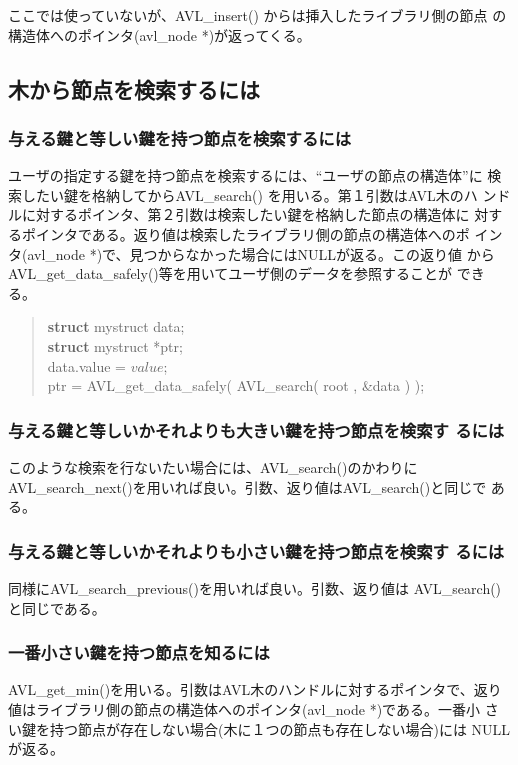 ここでは使っていないが、AVL\_insert() からは挿入したライブラリ側の節点
の構造体へのポインタ(avl\_node *)が返ってくる。

\subsection{木から節点を検索するには}
\subsubsection{与える鍵と等しい鍵を持つ節点を検索するには}
ユーザの指定する鍵を持つ節点を検索するには、``ユーザの節点の構造体''に
検索したい鍵を格納してからAVL\_search() を用いる。第１引数はAVL木のハ
ンドルに対するポインタ、第２引数は検索したい鍵を格納した節点の構造体に
対するポインタである。返り値は検索したライブラリ側の節点の構造体へのポ
インタ(avl\_node *)で、見つからなかった場合にはNULLが返る。この返り値
からAVL\_get\_data\_safely()等を用いてユーザ側のデータを参照することが
できる。
\begin{quote}
{\bf struct} mystruct data;\\
{\bf struct} mystruct *ptr;\\
data.value = $value$;\\
ptr = AVL\_get\_data\_safely( AVL\_search( root , \&data ) );
\end{quote}

\subsubsection{与える鍵と等しいかそれよりも大きい鍵を持つ節点を検索す
るには}

このような検索を行ないたい場合には、AVL\_search()のかわりに
AVL\_search\_next()を用いれば良い。引数、返り値はAVL\_search()と同じで
ある。

\subsubsection{与える鍵と等しいかそれよりも小さい鍵を持つ節点を検索す
るには}

同様にAVL\_search\_previous()を用いれば良い。引数、返り値は
AVL\_search()と同じである。

\subsubsection{一番小さい鍵を持つ節点を知るには}
AVL\_get\_min()を用いる。引数はAVL木のハンドルに対するポインタで、返り
値はライブラリ側の節点の構造体へのポインタ(avl\_node *)である。一番小
さい鍵を持つ節点が存在しない場合(木に１つの節点も存在しない場合)には
NULLが返る。

